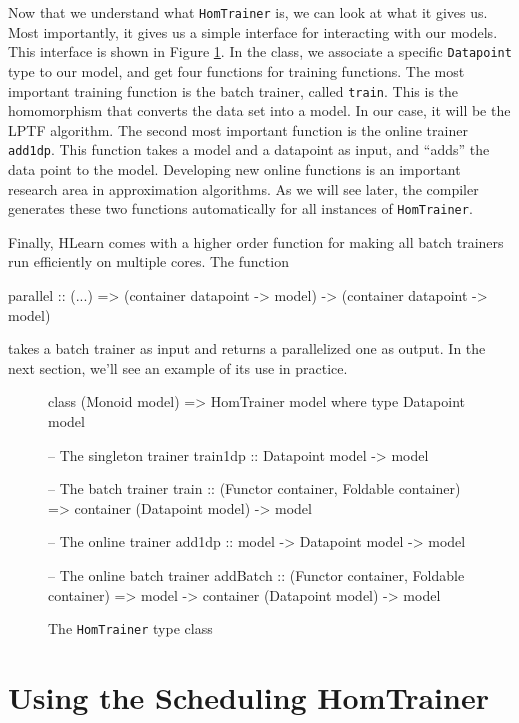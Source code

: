 \documentclass[tikz]{tmr}
\newcommand\h{\lstinline}
\newcommand\+{\mdoubleplus}
\begin{document}
Now that we understand what \h{HomTrainer} is, we can look at what it gives us.
Most importantly, it gives us a simple interface for interacting with our models.
This interface is shown in Figure \ref{alg:HomTrainer}.
In the class, we associate a specific \h{Datapoint} type to our model, and get four functions for training functions.
The most important training function is the batch trainer, called \h{train}.
This is the homomorphism that converts the data set into a model.
In our case, it will be the LPTF algorithm.
The second most important function is the online trainer \h{add1dp}.
This function takes a model and a datapoint as input, and ``adds'' the data point to the model.
Developing new online functions is an important research area in approximation algorithms.
As we will see later, the compiler generates these two functions automatically for all instances of \h{HomTrainer}.

Finally, HLearn comes with a higher order function for making all batch trainers run efficiently on multiple cores.
The function
\begin{spec}
parallel :: (...) => 
    (container datapoint -> model) -> (container datapoint -> model)
\end{spec}
takes a batch trainer as input and returns a parallelized one as output.
In the next section, we'll see an example of its use in practice.

\begin{figure}
\caption{The \h{HomTrainer} type class}
\label{alg:HomTrainer}
\begin{code}
class (Monoid model) => HomTrainer model where
    type Datapoint model

    -- The singleton trainer
    train1dp :: Datapoint model -> model
    
    -- The batch trainer
    train :: (Functor container, Foldable container) => 
        container (Datapoint model) -> model

    -- The online trainer
    add1dp :: model -> Datapoint model -> model
    
    -- The online batch trainer
    addBatch :: (Functor container, Foldable container) =>  
        model -> container (Datapoint model) -> model
\end{code}
\end{figure}

\section {Using the Scheduling HomTrainer}
\end{document}
